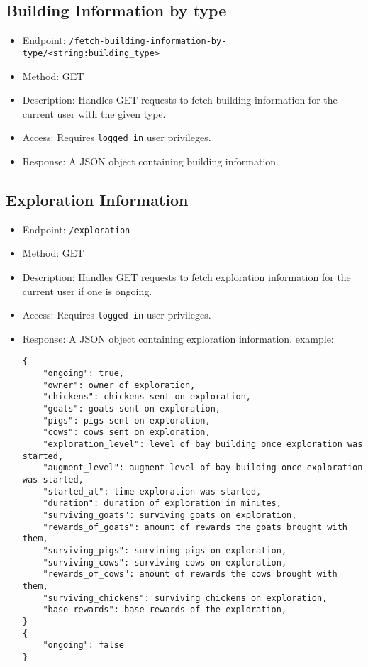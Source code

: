 \documentclass[12pt]{article}
\begin{document}
\subsection{Building Information by type}
\begin{itemize}
    \item Endpoint: \texttt{/fetch-building-information-by-type/<string:building_type>}
    \item Method: GET
    \item {Description:} Handles GET requests to fetch building information for the current user with the given type.
    \item {Access:} Requires \texttt{logged in} user privileges.
    \item {Response:} A JSON object containing building information.
\end{itemize}

\subsection{Exploration Information}
\begin{itemize}
    \item Endpoint: \texttt{/exploration}
    \item Method: GET
    \item {Description:} Handles GET requests to fetch exploration information for the current user if one is ongoing.
    \item {Access:} Requires \texttt{logged in} user privileges.
    \item {Response:} A JSON object containing exploration information. example:
    \begin{verbatim}
{
    "ongoing": true,
    "owner": owner of exploration,
    "chickens": chickens sent on exploration,
    "goats": goats sent on exploration,
    "pigs": pigs sent on exploration,
    "cows": cows sent on exploration,
    "exploration_level": level of bay building once exploration was started,
    "augment_level": augment level of bay building once exploration was started,
    "started_at": time exploration was started,
    "duration": duration of exploration in minutes,
    "surviving_goats": surviving goats on exploration,
    "rewards_of_goats": amount of rewards the goats brought with them,
    "surviving_pigs": survining pigs on exploration,
    "surviving_cows": surviving cows on exploration,
    "rewards_of_cows": amount of rewards the cows brought with them,
    "surviving_chickens": surviving chickens on exploration,
    "base_rewards": base rewards of the exploration,
}
{
    "ongoing": false
}
    \end{verbatim}
\end{itemize}
\end{document}
